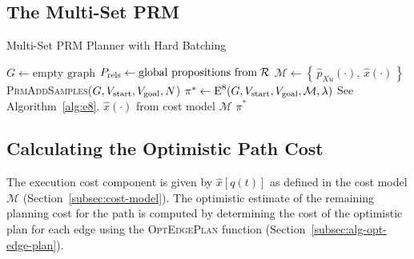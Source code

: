 \subsection{The Multi-Set PRM}

\begin{algorithm}
\caption{Multi-Set PRM Planner with Hard Batching}
\label{alg:multi-set-prm-hard}
\begin{algorithmic}[1]
\State $G \leftarrow \mbox{empty graph}$
\State $P_{\mbox{\scriptsize rels}} \leftarrow
   \mbox{global propositions from\;} \mathcal{R}$
\State $\mathcal{M} \leftarrow
   \left\{ \, {\hat p}_{Xu}(\cdot), \, {\hat x}(\cdot) \, \right\}$
\Loop
   \State \textsc{PrmAddSamples}($G,
      V_{\mbox{\scriptsize start}}, V_{\mbox{\scriptsize goal}},
      N$)
   \State $\pi^* \leftarrow \mbox{E}^8(G,
      V_{\mbox{\scriptsize start}}, V_{\mbox{\scriptsize goal}},
      \mathcal{M}, \lambda)$
      \Comment See Algorithm~\ref{alg:e8}.
      \Comment $\hat{x}(\cdot)$ from cost model $\mathcal{M}$
      \State \Return $\pi^*$
   \EndIf
\EndLoop
\EndProcedure
\end{algorithmic}
\end{algorithm}

\subsection{Calculating the Optimistic Path Cost}
\label{subsec:alg-opt-path-cost}

The execution cost component is given by ${\hat x}[q(t)]$
as defined in the cost model $\mathcal{M}$
(Section~\ref{subsec:cost-model}).
The optimistic estimate of the remaining planning cost for the path
is computed by determining the cost of the optimistic plan for each
edge using the \textsc{OptEdgePlan} function
(Section~\ref{subsec:alg-opt-edge-plan}).

